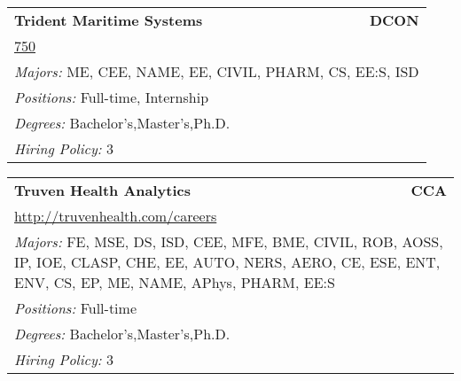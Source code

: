 \documentclass[twoside]{article}
\begin{document}
\begin{center}
\begin{multicols}{3}
\begin{FlushLeft}
\begin{minipage}{.9\columnwidth}
\end{minipage}
 
\begin{minipage}{.9\columnwidth}\begin{tabularx}{.95\columnwidth}{Xr}
                 {\Large\bf Trident Maritime Systems} & {\Large\bf DCON}\\
    \multicolumn{2}{p{.95\columnwidth}}{\url{750}}\\
    \multicolumn{2}{p{.95\columnwidth}}{\emph{Majors:} ME, CEE, NAME, EE, CIVIL, PHARM, CS, EE:S, ISD}\\
    \multicolumn{2}{p{.95\columnwidth}}{\emph{Positions:} Full-time, Internship}\\
    \multicolumn{2}{p{.95\columnwidth}}{\emph{Degrees:} Bachelor's,Master's,Ph.D.}\\
    \multicolumn{2}{p{.95\columnwidth}}{\emph{Hiring Policy:} 3}\\
    \end{tabularx}
    
\end{minipage}
 
\begin{minipage}{.9\columnwidth}\begin{tabularx}{.95\columnwidth}{Xr}
                 {\Large\bf Truven Health Analytics} & {\Large\bf CCA}\\
    \multicolumn{2}{p{.95\columnwidth}}{\url{http://truvenhealth.com/careers}}\\
    \multicolumn{2}{p{.95\columnwidth}}{\emph{Majors:} FE, MSE, DS, ISD, CEE, MFE, BME, CIVIL, ROB, AOSS, IP, IOE, CLASP, CHE, EE, AUTO, NERS, AERO, CE, ESE, ENT, ENV, CS, EP, ME, NAME, APhys, PHARM, EE:S}\\
    \multicolumn{2}{p{.95\columnwidth}}{\emph{Positions:} Full-time}\\
    \multicolumn{2}{p{.95\columnwidth}}{\emph{Degrees:} Bachelor's,Master's,Ph.D.}\\
    \multicolumn{2}{p{.95\columnwidth}}{\emph{Hiring Policy:} 3}\\
    \end{tabularx}
    
\end{minipage}
 

\end{FlushLeft}
\end{multicols}
\end{center}
\end{document}
